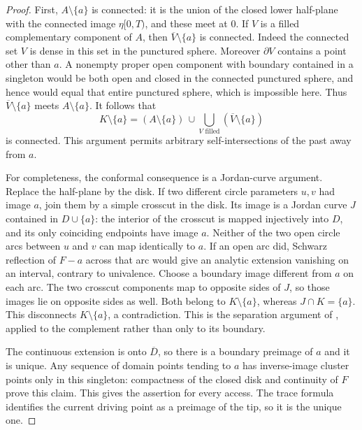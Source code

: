 \begin{proof}
First, $A\setminus\{a\}$ is connected: it is the union of the closed
lower half-plane with the connected image $\eta[0,T)$, and these meet
at $0$.  If $V$ is a filled complementary component of $A$, then
$\overline V\setminus\{a\}$ is connected.  Indeed the connected set
$V$ is dense in this set in the punctured sphere.  Moreover
$\partial V$ contains a point other than $a$.  A nonempty proper open
component with boundary contained in a singleton would be both open
and closed in the connected punctured sphere, and hence would equal
that entire punctured sphere, which is impossible here.  Thus
$\overline V\setminus\{a\}$ meets $A\setminus\{a\}$.  It follows
that
\[
 K\setminus\{a\}
  =(A\setminus\{a\})\,
    \cup\!\bigcup_{V\text{ filled}}
          (\overline V\setminus\{a\})
\]
is connected.  This argument permits arbitrary self-intersections of the
past away from $a$.

For completeness, the conformal consequence is a Jordan-curve
argument.  Replace the half-plane by the disk.  If two different circle
parameters $u,v$ had image $a$, join them by a simple crosscut in the
disk.  Its image is a Jordan curve $J$ contained in $D\cup\{a\}$:
the interior of the crosscut is mapped injectively into $D$, and its
only coinciding endpoints have image $a$.  Neither of the two open
circle arcs between $u$ and $v$ can map identically to $a$.  If an open
arc did, Schwarz reflection of $F-a$ across that arc would give an
analytic extension vanishing on an interval, contrary to univalence.
Choose a boundary image different from $a$ on each arc.  The two
crosscut components map to opposite sides of $J$, so those images lie
on opposite sides as well.  Both belong to $K\setminus\{a\}$,
whereas $J\cap K=\{a\}$.  This disconnects $K\setminus\{a\}$,
a contradiction.  This is the separation argument of
\cite[proof of Theorem~1, pp.~426--427, equations~(2.2)--(2.3)]{pommerenke1985},
applied to the complement rather than only to its boundary.

The continuous extension is onto $\overline D$, so there is a boundary
preimage of $a$ and it is unique.  Any sequence of domain points tending
to $a$ has inverse-image cluster points only in this singleton:
compactness of the closed disk and continuity of $F$ prove this claim.
This gives the assertion for every access.  The trace formula identifies
the current driving point as a preimage of the tip, so it is the unique
one.
\end{proof}

